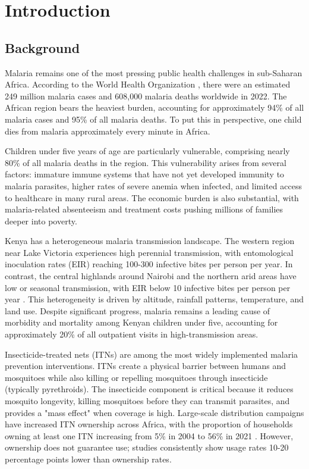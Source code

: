 \chapter{Introduction}

\section{Background}

Malaria remains one of the most pressing public health challenges in sub-Saharan Africa. According to the World Health Organization \citep{who2023malaria}, there were an estimated 249 million malaria cases and 608,000 malaria deaths worldwide in 2022. The African region bears the heaviest burden, accounting for approximately 94\% of all malaria cases and 95\% of all malaria deaths. To put this in perspective, one child dies from malaria approximately every minute in Africa.

Children under five years of age are particularly vulnerable, comprising nearly 80\% of all malaria deaths in the region. This vulnerability arises from several factors: immature immune systems that have not yet developed immunity to malaria parasites, higher rates of severe anemia when infected, and limited access to healthcare in many rural areas. The economic burden is also substantial, with malaria-related absenteeism and treatment costs pushing millions of families deeper into poverty.

Kenya has a heterogeneous malaria transmission landscape. The western region near Lake Victoria experiences high perennial transmission, with entomological inoculation rates (EIR) reaching 100-300 infective bites per person per year. In contrast, the central highlands around Nairobi and the northern arid areas have low or seasonal transmission, with EIR below 10 infective bites per person per year \citep{noor2009risks}. This heterogeneity is driven by altitude, rainfall patterns, temperature, and land use. Despite significant progress, malaria remains a leading cause of morbidity and mortality among Kenyan children under five, accounting for approximately 20\% of all outpatient visits in high-transmission areas.

Insecticide-treated nets (ITNs) are among the most widely implemented malaria prevention interventions. ITNs create a physical barrier between humans and mosquitoes while also killing or repelling mosquitoes through insecticide (typically pyrethroids). The insecticide component is critical because it reduces mosquito longevity, killing mosquitoes before they can transmit parasites, and provides a "mass effect" when coverage is high. Large-scale distribution campaigns have increased ITN ownership across Africa, with the proportion of households owning at least one ITN increasing from 5\% in 2004 to 56\% in 2021 \citep{who2023malaria}. However, ownership does not guarantee use; studies consistently show usage rates 10-20 percentage points lower than ownership rates.

